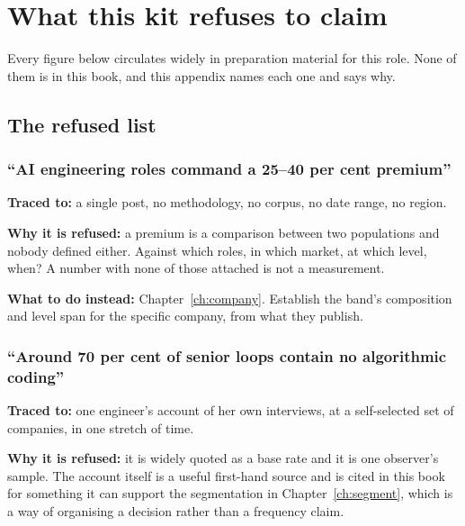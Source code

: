 \chapter{What this kit refuses to claim}
\label{app:refused}

Every figure below circulates widely in preparation material for this role.
None of them is in this book, and this appendix names each one and says why.


\section{The refused list}

\subsection*{``AI engineering roles command a 25--40 per cent premium''}

\textbf{Traced to:} a single post, no methodology, no corpus, no date range, no
region.

\textbf{Why it is refused:} a premium is a comparison between two populations
and nobody defined either. Against which roles, in which market, at which
level, when? A number with none of those attached is not a measurement.

\textbf{What to do instead:} Chapter~\ref{ch:company}. Establish the band's
composition and level span for the specific company, from what they publish.

\subsection*{``Around 70 per cent of senior loops contain no algorithmic coding''}

\textbf{Traced to:} one engineer's account of her own interviews, at a
self-selected set of companies, in one stretch of time.

\textbf{Why it is refused:} it is widely quoted as a base rate and it is one
observer's sample. The account itself is a useful first-hand source and is
cited in this book for something it can support \dash{} the segmentation in
Chapter~\ref{ch:segment}, which is a way of organising a decision rather than a
frequency claim.

